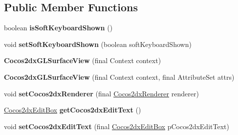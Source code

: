 \subsection*{Public Member Functions}
\begin{DoxyCompactItemize}
\item 
\mbox{\label{classorg_1_1cocos2dx_1_1lib_1_1Cocos2dxGLSurfaceView_a3fb4f7c70bfe67fc0bfa22c9e4699f2d}} 
boolean {\bfseries is\+Soft\+Keyboard\+Shown} ()
\item 
\mbox{\label{classorg_1_1cocos2dx_1_1lib_1_1Cocos2dxGLSurfaceView_aedae3edc63221fd7c5e9ec4e4ae6152c}} 
void {\bfseries set\+Soft\+Keyboard\+Shown} (boolean soft\+Keyboard\+Shown)
\item 
\mbox{\label{classorg_1_1cocos2dx_1_1lib_1_1Cocos2dxGLSurfaceView_a602153dc1c6295c37faf52eeeb82a837}} 
{\bfseries Cocos2dx\+G\+L\+Surface\+View} (final Context context)
\item 
\mbox{\label{classorg_1_1cocos2dx_1_1lib_1_1Cocos2dxGLSurfaceView_a09f149d60ac50869c49f7766b388aee7}} 
{\bfseries Cocos2dx\+G\+L\+Surface\+View} (final Context context, final Attribute\+Set attrs)
\item 
\mbox{\label{classorg_1_1cocos2dx_1_1lib_1_1Cocos2dxGLSurfaceView_af4e04e157d5939c0d6c1acb7e994a8bf}} 
void {\bfseries set\+Cocos2dx\+Renderer} (final \hyperlink{classorg_1_1cocos2dx_1_1lib_1_1Cocos2dxRenderer}{Cocos2dx\+Renderer} renderer)
\item 
\mbox{\label{classorg_1_1cocos2dx_1_1lib_1_1Cocos2dxGLSurfaceView_a87646d580f5494688f03787c491ca779}} 
\hyperlink{classorg_1_1cocos2dx_1_1lib_1_1Cocos2dxEditBox}{Cocos2dx\+Edit\+Box} {\bfseries get\+Cocos2dx\+Edit\+Text} ()
\item 
\mbox{\label{classorg_1_1cocos2dx_1_1lib_1_1Cocos2dxGLSurfaceView_ae331ecf491458ebeee6b59b562689ffb}} 
void {\bfseries set\+Cocos2dx\+Edit\+Text} (final \hyperlink{classorg_1_1cocos2dx_1_1lib_1_1Cocos2dxEditBox}{Cocos2dx\+Edit\+Box} p\+Cocos2dx\+Edit\+Text)

\end{DoxyCompactItemize}
